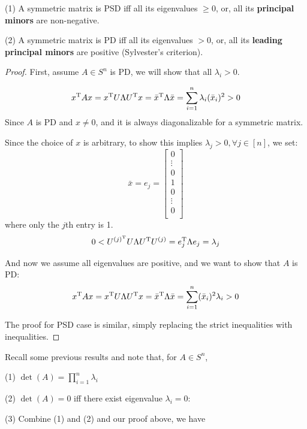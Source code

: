 \begin{theorem}

(1) A symmetric matrix is PSD iff all its eigenvalues $\geq 0$, or, all its \textbf{principal minors} are non-negative.

(2) A symmetric matrix is PD iff all its eigenvalues $> 0$, or, all its \textbf{leading principal minors} are positive (Sylvester's criterion).
\end{theorem}

\begin{proof}
	First, assume $A\in S^n$ is PD, we will show that all $\lambda_i > 0$. 
	
	\begin{equation*}
	x^{{\rm T}}Ax = x^{{\rm T}}U\Lambda U^{{\rm T}}x = \bar{x}^{{\rm T}}\Lambda\bar{x} = \sum^n_{i=1}\lambda_i(\bar{x}_i)^2 >0
	\end{equation*}
	Since $A$ is PD and $x\neq 0$, and it is always diagonalizable for a symmetric matrix.
	
	Since the choice of $x$ is arbitrary, to show this implies $\lambda_j > 0, \forall j\in [n]$, we set:
	$$\bar{x} = e_j = 
	\left[
	\begin{matrix}
	0\\
	\vdots\\
	0\\
	1\\
	0\\
	\vdots\\
	0\\
	\end{matrix}
	\right]
	$$
	where only the $j$th entry is 1.
	$$0 < U^{(j)^{{\rm T}}} U\Lambda U^{{\rm T}}U^{(j)} =e_j^{{\rm T}}\Lambda e_j = \lambda_j$$
	
	And now we assume all eigenvalues are positive, and we want to show that $A$ is PD:
	$$x^{{\rm T}}Ax =x^{{\rm T}}U\Lambda U^{{\rm T}}x = \bar{x}^{{\rm T}}\Lambda \bar{x} = \sum^n_{i=1}(\bar{x}_i)^2\lambda_i > 0$$
	
	The proof for PSD case is similar, simply replacing the strict inequalities with inequalities.
\end{proof}


Recall some previous results and note that, for $A\in S^n$,

(1) $\det(A) = \prod^n_{i=1}\lambda_i$

(2) $\det(A) = 0$ iff there exist eigenvalue $\lambda_i = 0$:

(3) Combine (1) and (2) and our proof above, we have

